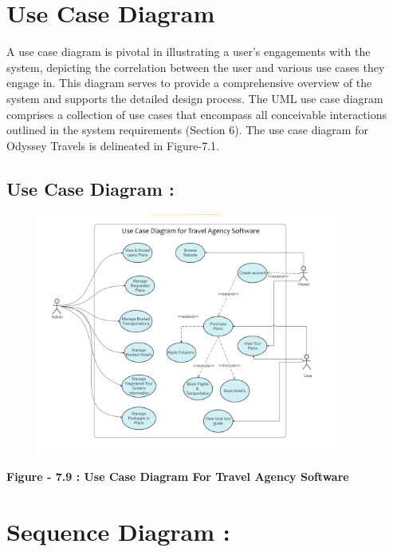 \documentclass{scrreprt}
\begin{document}
\section{Use Case Diagram}

A use case diagram is pivotal in illustrating a user's engagements with the system, depicting the correlation between the user and various use cases they engage in. This diagram serves to provide a comprehensive overview of the system and supports the detailed design process. The UML use case diagram comprises a collection of use cases that encompass all conceivable interactions outlined in the system requirements (Section 6). The use case diagram for Odyssey Travels is delineated in Figure-7.1.

\subsection *{ Use Case Diagram : }
{\includegraphics[width=450px, height=300px]{uml.png}}

\begin{center}
    \parbox{0.8\textwidth}{ 
        \centering
        \textbf{Figure - 7.9 : Use Case Diagram For Travel Agency Software}
    }
\end{center}

\section{ Sequence Diagram : }
\end{document}
